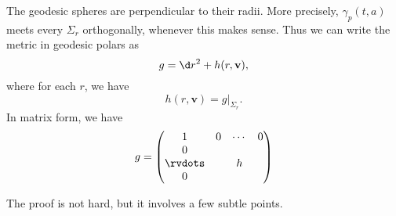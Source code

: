 \documentclass[a4paper]{article}
\begin{document}
\begin{thm}
  The geodesic spheres are perpendicular to their radii. More precisely, $\gamma_p(t, a)$ meets every $\Sigma_r$ orthogonally, whenever this makes sense. Thus we can write the metric in geodesic polars as
  \[
    g = \d r^2 + h(r, \mathbf{v}),
  \]
  where for each $r$, we have
  \[
    h(r, \mathbf{v}) = g|_{\Sigma_r}.
  \]
  In matrix form, we have
  \[
    g =
    \begin{pmatrix}
      1 & 0 & \cdots & 0\\
      0\\
      \rvdots & & h\\
      0
    \end{pmatrix}
  \]
\end{thm}

The proof is not hard, but it involves a few subtle points.
\end{document}
